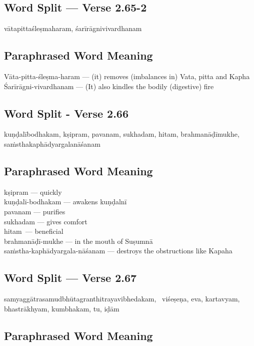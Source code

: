 \subsection*{Word Split --- Verse 2.65-2}


vātapittaśleṣmaharam, śarīrāgnivivardhanam

\subsection*{Paraphrased Word Meaning}


\begin{multicols}{2}
Vāta-pitta-śleṣma-haram --- (it) removes (imbalances in) Vata, pitta and Kapha\\
Śarīrāgni-vivardhanam --- (It) also kindles the bodily (digestive) fire
\end{multicols}

\subsection*{Word Split - Verse 2.66}


kuṇḍalībodhakam, kṣipram, pavanam, sukhadam, hitam, brahmanāḍīmukhe, saṁsthakaphādyargalanāśanam

\subsection*{Paraphrased Word Meaning}


\begin{multicols}{2}
kṣipram --- quickly \\
kuṇḍalī-bodhakam --- awakens kuṇḍalnī\\
pavanam --- purifies \\
sukhadam --- gives comfort \\
hitam --- beneficial\\
brahmanāḍī-mukhe --- in the mouth of Suṣumnā\\
saṁstha-kaphādyargala-nāśanam --- destroys the obstructions like Kapaha
\end{multicols}

\subsection*{Word Split --- Verse 2.67}


samyaggātrasamudbhūtagranthitrayavibhedakam,  viśeṣeṇa, eva, kartavyam, bhastrākhyam, kumbhakam, tu, iḍām

\subsection*{Paraphrased Word Meaning}


